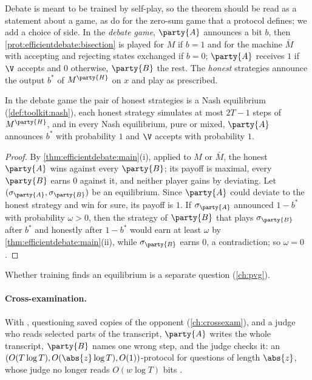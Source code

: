 \begin{refsection}
Debate is meant to be trained by self-play, so the theorem should be read as a statement about a game, as \textcite[Appendix~C]{BrownCohenEtAl2024} do for the zero-sum game that a protocol defines; we add a choice of side. In the \emph{debate game}, $\party{A}$ announces a bit $b$, then \cref{prot:efficientdebate:bisection} is played for $M$ if $b=1$ and for the machine $\bar M$ with accepting and rejecting states exchanged if $b=0$; $\party{A}$ receives $1$ if $\V$ accepts and $0$ otherwise, $\party{B}$ the rest. The \emph{honest} strategies announce the output $b^*$ of $M^{\party{H}}$ on $x$ and play as prescribed.

\begin{corollary}\label{cor:efficientdebate:game}
In the debate game the pair of honest strategies is a Nash equilibrium (\cref{def:toolkit:nash}), each honest strategy simulates at most $2T-1$ steps of $M^{\party{H}}$, and in every Nash equilibrium, pure or mixed, $\party{A}$ announces $b^*$ with probability $1$ and $\V$ accepts with probability $1$.
\end{corollary}

\begin{proof}
By \cref{thm:efficientdebate:main}(i), applied to $M$ or $\bar M$, the honest $\party{A}$ wins against every $\party{B}$; its payoff is maximal, every $\party{B}$ earns $0$ against it, and neither player gains by deviating. Let $(\sigma_{\party{A}},\sigma_{\party{B}})$ be an equilibrium. Since $\party{A}$ could deviate to the honest strategy and win for sure, its payoff is $1$. If $\sigma_{\party{A}}$ announced $1-b^*$ with probability $\omega>0$, then the strategy of $\party{B}$ that plays $\sigma_{\party{B}}$ after $b^*$ and honestly after $1-b^*$ would earn at least $\omega$ by \cref{thm:efficientdebate:main}(ii), while $\sigma_{\party{B}}$ earns $0$, a contradiction; so $\omega=0$.
\end{proof}

Whether training finds an equilibrium is a separate question (\cref{ch:pvg}).

\paragraph{Cross-examination.} With  \parencite{BarnesChristiano2020}, questioning saved copies of the opponent (\cref{ch:crossexam}), and a judge who reads selected parts of the transcript, $\party{A}$ writes the whole transcript, $\party{B}$ names one wrong step, and the judge checks it: an $(O(T\log T),O(\abs{z}\log T),O(1))$-protocol for questions of length $\abs{z}$, whose judge no longer reads $O(w\log T)$ bits \parencite[Theorem~5.3]{BrownCohenEtAl2024}.


\end{refsection}
